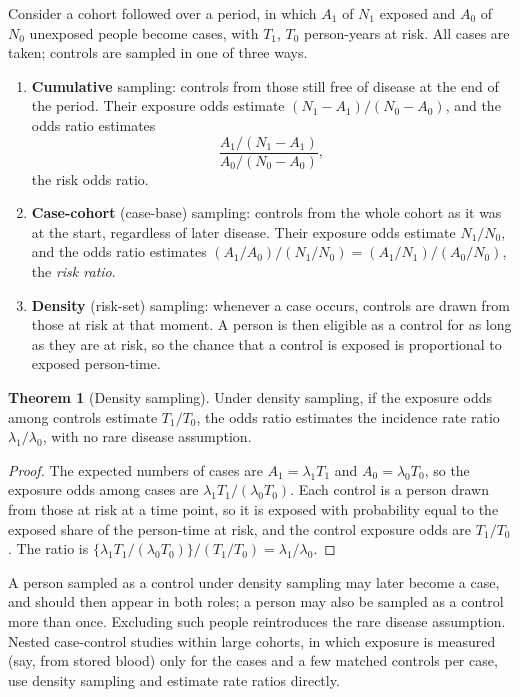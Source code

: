 \documentclass[11pt,a4paper]{article}
\numberwithin{equation}{section}
\theoremstyle{definition}
\newtheorem{thm}{Theorem}[subsection]
\begin{document}
Consider a cohort followed over a period, in which $A_1$ of $N_1$ exposed and $A_0$ of $N_0$ unexposed people become cases, with $T_1$, $T_0$
person-years at risk. All cases are taken; controls are sampled in one of three ways.
\begin{enumerate}
\item \textbf{Cumulative} sampling: controls from those still free of disease at the end of the period. Their exposure odds estimate
$(N_1 - A_1)/(N_0 - A_0)$, and the odds ratio estimates
\[
\frac{A_1/(N_1 - A_1)}{A_0/(N_0 - A_0)} ,
\]
the risk odds ratio.
\item \textbf{Case-cohort} (case-base) sampling: controls from the whole cohort as it was at the start, regardless of later disease.
Their exposure odds estimate $N_1/N_0$, and the odds ratio estimates $(A_1/A_0)/(N_1/N_0) = (A_1/N_1)/(A_0/N_0)$, the \emph{risk ratio}.
\item \textbf{Density} (risk-set) sampling: whenever a case occurs, controls are drawn from those at risk at that moment. A person is then
eligible as a control for as long as they are at risk, so the chance that a control is exposed is proportional to exposed person-time.
\end{enumerate}

\begin{thm}[Density sampling]
\label{thm:density}
Under density sampling, if the exposure odds among controls estimate $T_1/T_0$, the odds ratio estimates the incidence rate ratio
$\lambda_1/\lambda_0$, with no rare disease assumption.
\end{thm}

\begin{proof}
The expected numbers of cases are $A_1 = \lambda_1 T_1$ and $A_0 = \lambda_0 T_0$, so the exposure odds among cases are $\lambda_1 T_1/(\lambda_0 T_0)$. Each control is
a person drawn from those at risk at a time point, so it is exposed with probability equal to the exposed share of the person-time at
risk, and the control exposure odds are $T_1/T_0$. The ratio is $\{\lambda_1 T_1/(\lambda_0 T_0)\}/(T_1/T_0) = \lambda_1/\lambda_0$.
\end{proof}

A person sampled as a control under density sampling may later become a case, and should then appear in both roles; a person may also
be sampled as a control more than once. Excluding such people reintroduces the rare disease assumption. Nested case-control studies
within large cohorts, in which exposure is measured (say, from stored blood) only for the cases and a few matched controls per case,
use density sampling and estimate rate ratios directly.
\end{document}

